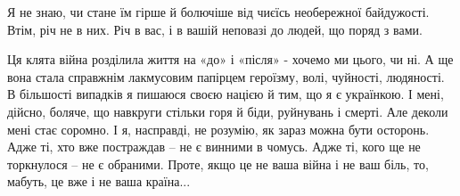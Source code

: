 Я не знаю, чи стане їм гірше й болючіше від чиєїсь необережної байдужості.
Втім, річ не в них. Річ в вас, і в вашій неповазі до людей, що поряд з
вами.

Ця клята війна розділила життя на «до» і «після» - хочемо ми цього, чи ні.
А ще вона стала справжнім лакмусовим папірцем героїзму, волі, чуйності,
людяності. В більшості випадків я пишаюся своєю нацією й тим, що я є
українкою. І мені, дійсно, боляче, що навкруги стільки горя й біди,
руйнувань і смерті. Але деколи мені стає соромно. І я, насправді, не
розумію, як зараз можна бути осторонь. Адже ті, хто вже постраждав – не є
винними в чомусь. Адже ті, кого ще не торкнулося – не є обраними. Проте,
якщо це не ваша війна і не ваш біль, то, мабуть, це вже і не ваша країна...

